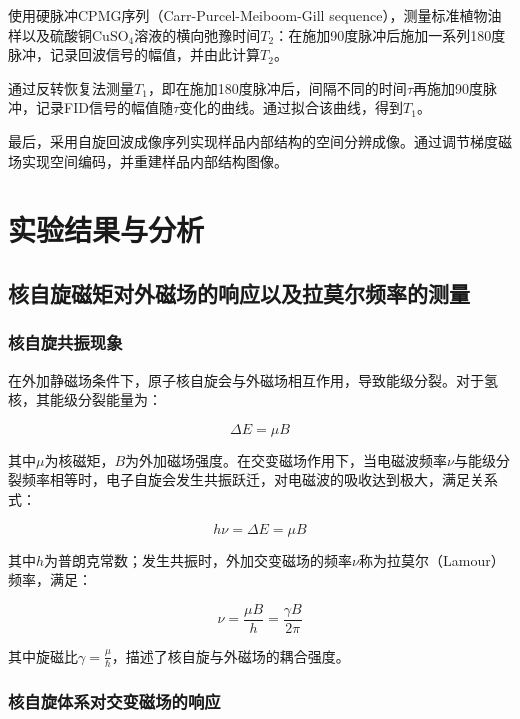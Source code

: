 \documentclass{thuemp}
\begin{document}
使用硬脉冲CPMG序列（Carr-Purcel-Meiboom-Gill sequence），测量标准植物油样以及硫酸铜$\text{CuSO}_4$溶液的横向弛豫时间$T_2$：在施加90度脉冲后施加一系列180度脉冲，记录回波信号的幅值，并由此计算$T_2$。

通过反转恢复法测量$T_1$，即在施加180度脉冲后，间隔不同的时间$\tau$再施加90度脉冲，记录FID信号的幅值随$\tau$变化的曲线。通过拟合该曲线，得到$T_1$。

最后，采用自旋回波成像序列实现样品内部结构的空间分辨成像。通过调节梯度磁场实现空间编码，并重建样品内部结构图像。

\section{实验结果与分析}

\subsection{核自旋磁矩对外磁场的响应以及拉莫尔频率的测量}

\subsubsection{核自旋共振现象}

在外加静磁场条件下，原子核自旋会与外磁场相互作用，导致能级分裂。对于氢核，其能级分裂能量为：
    
\begin{equation}
\Delta E = \mu B
\end{equation}

其中$\mu$为核磁矩，$B$为外加磁场强度。在交变磁场作用下，当电磁波频率$\nu$与能级分裂频率相等时，电子自旋会发生共振跃迁，对电磁波的吸收达到极大，满足关系式：

\begin{equation}
h \nu  = \Delta E = \mu B
\end{equation}

其中$h$为普朗克常数；发生共振时，外加交变磁场的频率$\nu$称为拉莫尔（Lamour）频率，满足：

\begin{equation}
\nu = \frac{\mu B }{h} = \frac{\gamma B}{2\pi}
\end{equation}

其中旋磁比$\gamma = \frac{\mu}{\hbar}$，描述了核自旋与外磁场的耦合强度。

\subsubsection{核自旋体系对交变磁场的响应}
\end{document}

